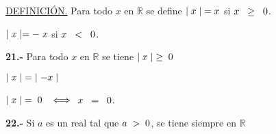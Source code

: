 \documentclass[12pt]{article}
\begin{document}
{\underline{DEFINICIÓN.}} Para todo $x$ en $\mathbb{R}$ se define $\mid x\mid \hspace{0.1cm} = x$ \hspace{0.45cm} si \hspace{0.2cm} $x\hspace{0.2cm} \geq \hspace{0.2cm}0$. \vspace{0.1cm}

\hspace{8.63cm} $\mid x\mid = -\hspace{0.1cm}  x$ \hspace{0.2cm} si \hspace{0.1cm} $x\hspace{0.2cm} < \hspace{0.2cm}0$. 
\vspace{0.3cm}

\textbf{21.-} Para todo $x$ en $\mathbb{R}$ se tiene $\mid x\mid \hspace{0.1cm} \geq \hspace{0.1cm} 0$ \vspace{0.1cm}

\hspace{6.45cm} $\mid x\mid \hspace{0.1cm}=\hspace{0.1cm} \mid -x\mid$ \hspace{0.2cm} \vspace{0.1cm}

\hspace{6.45cm} $\mid x\mid \hspace{0.1cm}= \hspace{0.1cm} 0 \hspace{0.3cm} \Longleftrightarrow\hspace{0.1cm}$ \hspace{0.1cm} $x\hspace{0.2cm}=\hspace{0.2cm}0$. \vspace{0.2cm}

\textbf{22.-} Si $a$ es un real tal que $a\hspace{0.1cm}>\hspace{0.1cm}0$, se tiene siempre en $\mathbb{R}$ \vspace{0.2cm}
\end{document}
